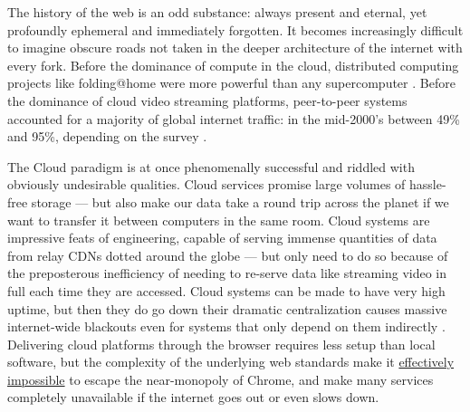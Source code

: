 \documentclass{article}
\begin{document}
The history of the web is an odd substance: always present and eternal,
yet profoundly ephemeral and immediately forgotten. It becomes
increasingly difficult to imagine obscure roads not taken in the deeper
architecture of the internet with every fork. Before the
dominance of compute in the cloud, distributed computing projects like
folding@home were more powerful than any supercomputer \cite{v.FileFoldingHome2012}. Before the dominance of cloud video
streaming platforms, peer-to-peer systems accounted for a majority of
global internet traffic: in the mid-2000's between 49\% and 95\%,
depending on the survey \cite{vandersarBitTorrentOneThird2006, vandersarP2PTrafficBooming2007} .

The Cloud paradigm is at once phenomenally successful and riddled with
obviously undesirable qualities. Cloud services promise large volumes of
hassle-free storage --- but also make our data take a round trip across
the planet if we want to transfer it between computers in the same room.
Cloud systems are impressive feats of engineering, capable of serving
immense quantities of data from relay CDNs dotted around the globe ---
but only need to do so because of the preposterous inefficiency of
needing to re-serve data like streaming video in full each time they are
accessed. Cloud systems can be made to have very high uptime, but then
they do go down their dramatic centralization causes massive
internet-wide blackouts even for systems that only depend on them
indirectly \cite{lawlerAmazonServerOutage2021, hutchinsonAmazonWebServices2012} . Delivering cloud platforms through
the browser requires less setup than local software, but the complexity
of the underlying web standards make it
\href{https://drewdevault.com/2020/03/18/Reckless-limitless-scope.html}{effectively
impossible} \cite{devaultRecklessInfiniteScope2020}  to escape
the near-monopoly of
Chrome, and make many services completely
unavailable if the internet goes out or even slows down.
\end{document}
